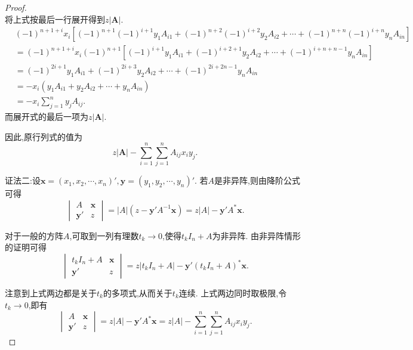 \documentclass[../../main.tex]{subfiles}%
\begin{document}
\begin{proof}
\begin{equation}
\nonumber
\end{equation}
将上式按最后一行展开得到$z\left|\boldsymbol{A}\right|$.
\begin{equation}
\begin{split}
&\left( -1 \right) ^{n+1+i}x_i\left[ \left( -1 \right) ^{n+1}\left( -1 \right) ^{i+1}y_1A_{i1}+\left( -1 \right) ^{n+2}\left( -1 \right) ^{i+2}y_2A_{i2}+\cdots +\left( -1 \right) ^{n+n}\left( -1 \right) ^{i+n}y_nA_{in} \right] 
\\
&=\left( -1 \right) ^{n+1+i}x_i\left( -1 \right) ^{n+1}\left[ \left( -1 \right) ^{i+1}y_1A_{i1}+\left( -1 \right) ^{i+2+1}y_2A_{i2}+\cdots +\left( -1 \right) ^{i+n+n-1}y_nA_{in} \right] 
\\
&=\left( -1 \right) ^{2i+1}y_1A_{i1}+\left( -1 \right) ^{2i+3}y_2A_{i2}+\cdots +\left( -1 \right) ^{2i+2n-1}y_nA_{in}
\\
&=-x_i\left( y_1A_{i1}+y_2A_{i2}+\cdots +y_nA_{in} \right) 
\\
&=-x_i\sum_{j=1}^n{y_jA_{ij}.}
\end{split}
\nonumber
\end{equation}
而展开式的最后一项为$z\left|\boldsymbol{A}\right|$.

因此,原行列式的值为
\begin{equation}
z|\boldsymbol{A}|-\sum_{i=1}^n{\sum_{j=1}^n{A_{ij}x_iy_j.}}
\nonumber
\end{equation}

{\color{blue}证法二:}设\(\boldsymbol{x}=(x_1,x_2,\cdots,x_n)',\boldsymbol{y}=(y_1,y_2,\cdots,y_n)'\). 若\(A\)是非异阵,则由降阶公式可得
\[
\begin{vmatrix}
A & \boldsymbol{x}\\
\boldsymbol{y}' & z
\end{vmatrix}=|A|(z - \boldsymbol{y}'A^{-1}\boldsymbol{x})=z|A| - \boldsymbol{y}'A^*\boldsymbol{x}.
\]

对于一般的方阵\(A\),可取到一列有理数\(t_k\rightarrow0\),使得\(t_kI_n + A\)为非异阵. 由非异阵情形的证明可得
\[
\begin{vmatrix}
t_kI_n + A & \boldsymbol{x}\\
\boldsymbol{y}' & z
\end{vmatrix}=z|t_kI_n + A| - \boldsymbol{y}'(t_kI_n + A)^*\boldsymbol{x}.
\]

注意到上式两边都是关于\(t_k\)的多项式,从而关于\(t_k\)连续. 上式两边同时取极限,令\(t_k\rightarrow0\),即有
\[
\begin{vmatrix}
A & \boldsymbol{x}\\
\boldsymbol{y}' & z
\end{vmatrix}=z|A| - \boldsymbol{y}'A^*\boldsymbol{x}=z|A|-\sum_{i = 1}^{n}\sum_{j = 1}^{n}A_{ij}x_iy_j.
\]

\end{proof}
\end{document}
